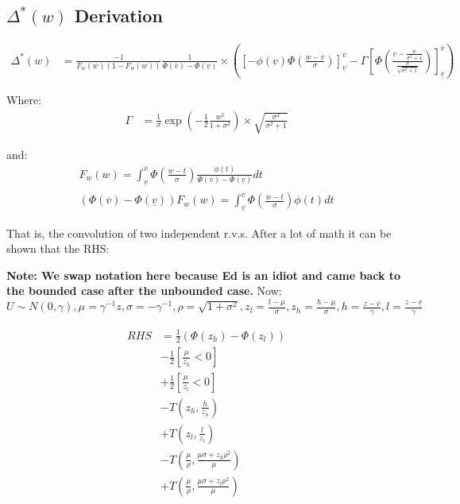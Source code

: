 \documentclass{article}
\begin{document}
\subsection*{$\Delta^*(w)$ Derivation}

\begin{align*}
    \Delta^*(w) &= \frac{-1}{F_w(w)(1 - F_w(w))} \frac{1}{\Phi(\overline{v}) - \Phi(\underline{v})} \times \left(
        \left[ -\phi(v)\Phi\left(\frac{w - v}{\sigma}\right)\right]^{\overline{v}}_{\underline{v}} 
        - \Gamma \left[
            \Phi\left(
                \frac{v - \frac{w}{\sigma^2 + 1}}{\frac{\sigma}{\sqrt{ \sigma^2 + 1}}}
            \right)
        \right]^{\overline{v}}_{\underline{v}}
    \right)
\end{align*}

Where:
\begin{align*}
    \Gamma &= \frac{1}{\sigma}\exp\left(
        -\frac{1}{2} \frac{w^2}{1 + \sigma^2}
    \right) \times \sqrt{\frac{\sigma^2}{\sigma^2 + 1}}
\end{align*}

and:
\begin{align*}
    F_w(w) = \int^{\overline{v}}_{\underline{v}} \Phi \left(
        \frac{w - t}{\sigma}
    \right) \frac{\phi(t)}{\Phi(\overline{v}) - \Phi(\underline{v})} dt  \\
    (\Phi(\overline{v}) - \Phi(\underline{v}))F_w(w) = \int^{\overline{v}}_{\underline{v}} \Phi \left(
        \frac{w - t}{\sigma}
    \right) \phi(t) dt 
\end{align*}

That is, the convolution of two independent r.v.s. After a lot of math it can be shown that the RHS:


\textbf{Note: We swap notation here because Ed is an idiot and came back to the 
bounded case after the unbounded case.}
Now: $U \sim N(0, \gamma), \mu = \gamma^{-1}z, \sigma = -\gamma^{-1}, \rho = \sqrt{1 + \sigma^2}, z_l = \frac{l - \mu}{\sigma}, z_h = \frac{h-\mu}{\sigma}, 
h = \frac{z - \overline{v}}{\gamma}, l = \frac{z - \underline{v}}{\gamma}$

\begin{align*}
    RHS &= \frac{1}{2} \left(
        \Phi(z_h) - \Phi(z_l)
    \right)  \\
    &- \frac{1}{2} \left[
        \frac{\mu}{z_h} < 0
    \right] \\
    &+ \frac{1}{2} \left[
        \frac{\mu}{z_l} < 0
    \right] \\
    &- T\left(z_h, \frac{h}{z_h}\right) \\
    &+ T\left(z_l, \frac{l}{z_l}\right) \\
    &- T\left(\frac{\mu}{\rho}, \frac{
        \mu\sigma + z_h \rho^2
    }{
        \mu
    }\right) \\
    &+ T\left(\frac{\mu}{\rho}, \frac{
        \mu\sigma + z_l \rho^2
    }{
        \mu
    }\right) \\
\end{align*}
\end{document}
